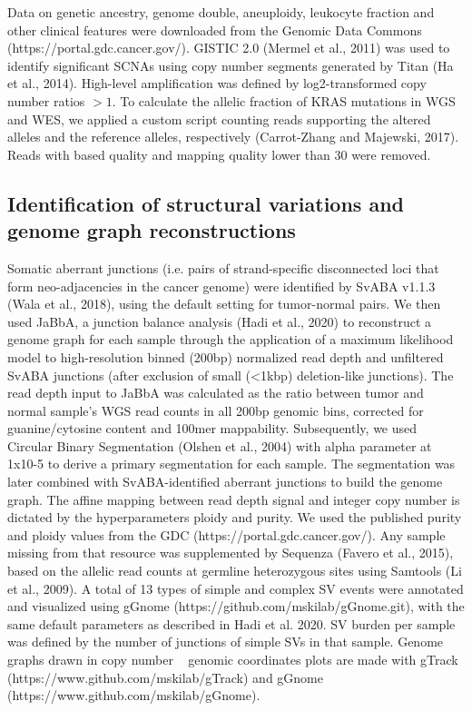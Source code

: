 \documentclass[phd,tocprelim]{cornell}
\begin{document}
Data on genetic ancestry, genome double, aneuploidy, leukocyte fraction and other clinical features were downloaded from the Genomic Data Commons (https://portal.gdc.cancer.gov/). GISTIC 2.0 (Mermel et al., 2011) was used to identify significant SCNAs using copy number segments generated by Titan (Ha et al., 2014). High-level amplification was defined by log2-transformed copy number ratios $>1$. To calculate the allelic fraction of KRAS mutations in WGS and WES, we applied a custom script counting reads supporting the altered alleles and the reference alleles, respectively (Carrot-Zhang and Majewski, 2017). Reads with based quality and mapping quality lower than 30 were removed.

\subsection*{Identification of structural variations and genome graph reconstructions}
Somatic aberrant junctions (i.e. pairs of strand-specific disconnected loci that form neo-adjacencies in the cancer genome) were identified by SvABA v1.1.3 (Wala et al., 2018), using the default setting for tumor-normal pairs. We then used JaBbA, a junction balance analysis (Hadi et al., 2020) to reconstruct a genome graph for each sample through the application of a maximum likelihood model to high-resolution binned (200bp) normalized read depth and unfiltered SvABA junctions (after exclusion of small (<1kbp) deletion-like junctions). The read depth input to JaBbA was calculated as the ratio between tumor and normal sample’s WGS read counts in all 200bp genomic bins, corrected for guanine/cytosine content and 100mer mappability. Subsequently, we used Circular Binary Segmentation (Olshen et al., 2004) with alpha parameter at 1x10-5 to derive a primary segmentation for each sample. The segmentation was later combined with SvABA-identified aberrant junctions to build the genome graph. The affine mapping between read depth signal and integer copy number is dictated by the hyperparameters ploidy and purity. We used the published purity and ploidy values from the GDC (https://portal.gdc.cancer.gov/). Any sample missing from that resource was supplemented by Sequenza (Favero et al., 2015), based on the allelic read counts at germline heterozygous sites using Samtools (Li et al., 2009). A total of 13 types of simple and complex SV events were annotated and visualized using gGnome (https://github.com/mskilab/gGnome.git), with the same default parameters as described in Hadi et al. 2020. SV burden per sample was defined by the number of junctions of simple SVs in that sample. Genome graphs drawn in copy number ~ genomic coordinates plots are made with gTrack (https://www.github.com/mskilab/gTrack) and gGnome (https://www.github.com/mskilab/gGnome).
\end{document}
